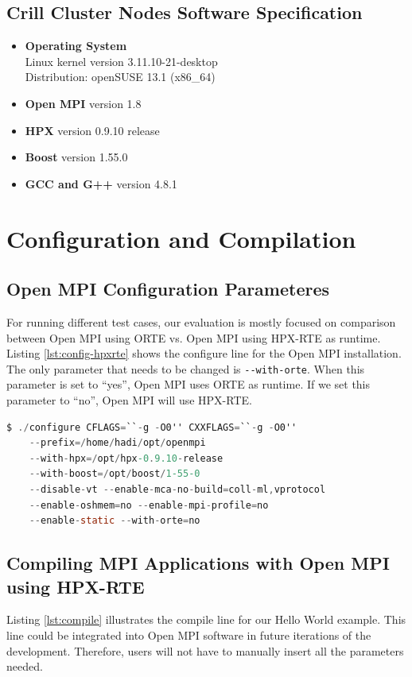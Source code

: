 \subsection{Crill Cluster Nodes Software Specification}
\begin{itemize}
\item \textbf{Operating System}\\
  Linux kernel version 3.11.10-21-desktop\\
  Distribution: openSUSE 13.1 (x86\_64)
\item \textbf{Open MPI} version 1.8
\item \textbf{HPX} version 0.9.10 release
\item \textbf{Boost} version 1.55.0
\item \textbf{GCC and G++} version 4.8.1
\end{itemize}


\section{Configuration and Compilation}

\subsection{Open MPI Configuration Parameteres}
For running different test cases, our evaluation is mostly focused on comparison between Open MPI using ORTE vs. Open MPI using HPX-RTE as runtime.
Listing \ref{lst:config-hpxrte} shows the configure line for the Open MPI installation. The only parameter that needs to be changed is \verb|--with-orte|. When this parameter is set to ``yes'', Open MPI uses ORTE as runtime. If we set this parameter to ``no'', Open MPI will use HPX-RTE.

\begin{lstlisting}[language=C, frame=single, basicstyle=\footnotesize, caption=Configure Line of Open MPI with HPX-RTE\label{lst:config-hpxrte}]
  $ ./configure CFLAGS=``-g -O0'' CXXFLAGS=``-g -O0''
    --prefix=/home/hadi/opt/openmpi
    --with-hpx=/opt/hpx-0.9.10-release
    --with-boost=/opt/boost/1-55-0
    --disable-vt --enable-mca-no-build=coll-ml,vprotocol
    --enable-oshmem=no --enable-mpi-profile=no
    --enable-static --with-orte=no
\end{lstlisting}

\subsection{Compiling MPI Applications with Open MPI using HPX-RTE}
Listing \ref{lst:compile} illustrates the compile line for our Hello World example. This line could be integrated into Open MPI software in future iterations of the development. Therefore, users will not have to manually insert all the parameters needed.

